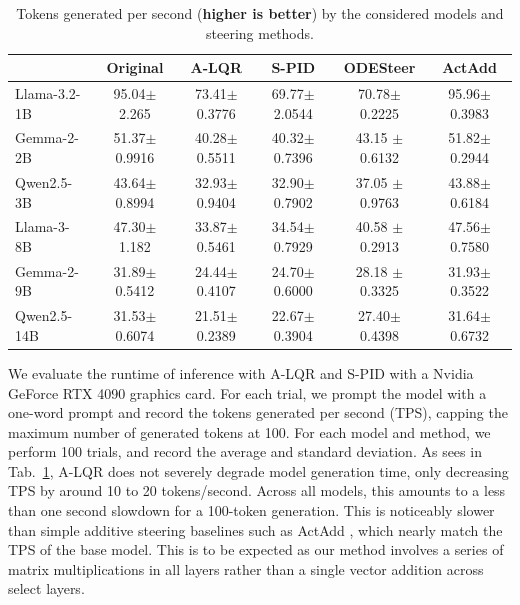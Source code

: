 \documentclass{article}
\theoremstyle{plain}
\theoremstyle{definition}
\theoremstyle{remark}
\begin{document}
\begin{table}[H]%

    \centering %
    \footnotesize
    \setlength{\tabcolsep}{3pt} %
    \renewcommand{\arraystretch}{1.5}
    \begin{threeparttable}
    \caption{Tokens generated per second (\textbf{higher is better}) by the considered models and steering methods. }\label{ap:tab:runtime_results}
    \begin{tabular}{l|ccccc}
    \toprule
    &  \textbf{Original} & \textbf{A-LQR} & \textbf{S-PID} & \textbf{ODESteer} & \textbf{ActAdd} \\
    \midrule
    Llama-3.2-1B & 95.04{\tiny $\pm$ 2.265} & 73.41{\tiny $\pm$ 0.3776} & 69.77{\tiny $\pm$ 2.0544} & 70.78{\tiny $\pm$ 0.2225} & 95.96{\tiny $\pm$ 0.3983} \\
    Gemma-2-2B & 51.37{\tiny $\pm$ 0.9916} & 40.28{\tiny $\pm$ 0.5511} & 40.32{\tiny $\pm$ 0.7396} & {43.15 \tiny $\pm$ 0.6132} & 51.82{\tiny $\pm$ 0.2944} \\
    Qwen2.5-3B & 43.64{\tiny $\pm$ 0.8994} & 32.93{\tiny $\pm$ 0.9404} & 32.90{\tiny $\pm$ 0.7902} & {37.05 \tiny $\pm$ 0.9763} & 43.88{\tiny $\pm$ 0.6184} \\
    Llama-3-8B & 47.30{\tiny $\pm$ 1.182} & 33.87{\tiny$\pm$0.5461} & 34.54{\tiny$\pm$0.7929} & {40.58 \tiny $\pm$ 0.2913} & 47.56{\tiny$\pm$0.7580} \\
    Gemma-2-9B & 31.89{\tiny $\pm$ 0.5412} & 24.44{\tiny $\pm$ 0.4107} & 24.70{\tiny $\pm$ 0.6000} & {28.18 \tiny $\pm$ 0.3325} & 31.93{\tiny $\pm$ 0.3522} \\ 
    Qwen2.5-14B & 31.53{\tiny $\pm$ 0.6074} & 21.51{\tiny $\pm$ 0.2389} &22.67{\tiny $\pm$ 0.3904} & {27.40\tiny $\pm$ 0.4398} & 31.64{\tiny $\pm$ 0.6732} \\
    \bottomrule
    \end{tabular}
    \end{threeparttable}
\end{table}

We evaluate the runtime of inference with A-LQR and S-PID with a Nvidia GeForce RTX 4090 graphics card. For each trial, we prompt the model with a one-word prompt and record the tokens generated per second (TPS), capping the maximum number of generated tokens at 100. For each model and method, we perform 100 trials, and record the average and standard deviation. As sees in Tab.~\ref{ap:tab:runtime_results}, A-LQR does not severely degrade model generation time, only decreasing TPS by around 10 to 20 tokens/second. Across all models, this amounts to a less than one second slowdown for a 100-token generation. This is noticeably slower than simple additive steering baselines such as ActAdd \cite{turner2024activation}, which nearly match the TPS of the base model. This is to be expected as our method involves a series of matrix multiplications in all layers rather than a single vector addition across select layers. 
\end{document}
